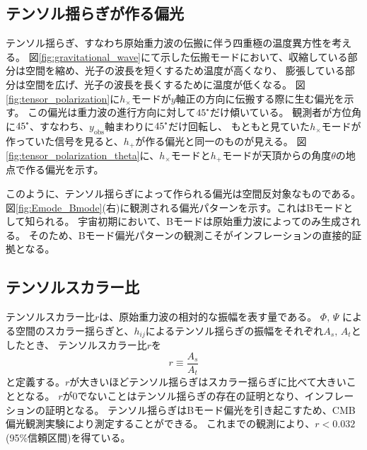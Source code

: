 \documentclass[../../main.tex]{subfiles}
\begin{document}
\subsection{テンソル揺らぎが作る偏光}
テンソル揺らぎ、すなわち原始重力波の伝搬に伴う四重極の温度異方性を考える。
図\ref{fig:gravitational_wave}にて示した伝搬モードにおいて、収縮している部分は空間を縮め、光子の波長を短くするため温度が高くなり、
膨張している部分は空間を広げ、光子の波長を長くするために温度が低くなる。
図\ref{fig:tensor_polarization}に$h_{\times}$モードが$y$軸正の方向に伝搬する際に生む偏光を示す。
この偏光は重力波の進行方向に対して$45\tcdegree$だけ傾いている。
観測者が方位角に$45\tcdegree$、すなわち、$y_{\mathrm{obs}}$軸まわりに$45\tcdegree$だけ回転し、
もともと見ていた$h_{\times}$モードが作っていた信号を見ると、$h_{+}$が作る偏光と同一のものが見える。
図\ref{fig:tensor_polarization_theta}に、$h_{\times}$モードと$h_{+}$モードが天頂からの角度$\theta$の地点で作る偏光を示す。

このように、テンソル揺らぎによって作られる偏光は空間反対象なものである。
図\ref{fig:Emode_Bmode}(右)に観測される偏光パターンを示す。これはBモードとして知られる。
宇宙初期において、Bモードは原始重力波によってのみ生成される。
そのため、Bモード偏光パターンの観測こそがインフレーションの直接的証拠となる。


\subsection{テンソルスカラー比}
テンソルスカラー比$r$は、原始重力波の相対的な振幅を表す量である。
$\Phi,\,\Psi$ による空間のスカラー揺らぎと、$h_{ij}$によるテンソル揺らぎの振幅をそれぞれ$A_{s},\,A_{t}$としたとき、
テンソルスカラー比$r$を
\begin{equation}
    r \equiv \dfrac{A_s}{A_t}
\end{equation}
と定義する。$r$が大きいほどテンソル揺らぎはスカラー揺らぎに比べて大きいこととなる。
$r$が0でないことはテンソル揺らぎの存在の証明となり、インフレーションの証明となる。
テンソル揺らぎはBモード偏光を引き起こすため、CMB偏光観測実験により測定することができる。
これまでの観測により、$r<0.032$(95\%信頼区間)を得ている\cite{PhysRevLett.127.151301}。
\end{document}
